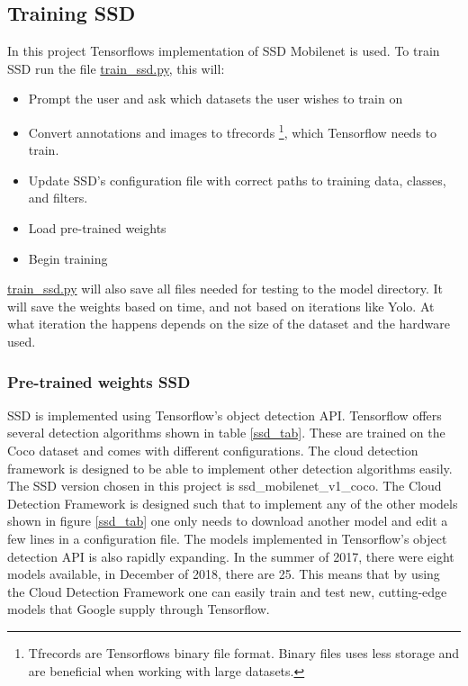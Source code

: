 \newpage

\subsection{Training SSD}
In this project Tensorflows implementation of SSD Mobilenet is used. To train SSD run the file \url{train_ssd.py}, this will:

\begin{itemize}
    \item Prompt the user and ask which datasets the user wishes to train on
    \item Convert annotations and images to tfrecords \footnote{Tfrecords are Tensorflows binary file format. Binary files uses less storage and are beneficial when working with large datasets.}, which Tensorflow needs to train.
    \item Update SSD's configuration file with correct paths to training data, classes, and filters.
    \item Load pre-trained weights
    \item Begin training
\end{itemize}

\url{train_ssd.py} will also save all files needed for testing to the model directory. It will save the weights based on time, and not based on iterations like Yolo. At what iteration the happens depends on the size of the dataset and the hardware used. 

\subsubsection{Pre-trained weights SSD}
SSD is implemented using Tensorflow's object detection API. Tensorflow offers several detection algorithms shown in table \ref{ssd_tab}. These are trained on the Coco dataset and comes with different configurations. The cloud detection framework is designed to be able to implement other detection algorithms easily. The SSD version chosen in this project is ssd\_mobilenet\_v1\_coco. The Cloud Detection Framework is designed such that to implement any of the other models shown in figure \ref{ssd_tab} one only needs to download another model and edit a few lines in a configuration file. The models implemented in Tensorflow's object detection API is also rapidly expanding. In the summer of 2017, there were eight models available, in December of 2018, there are 25. This means that by using the Cloud Detection Framework one can easily train and test new, cutting-edge models that Google supply through Tensorflow.

